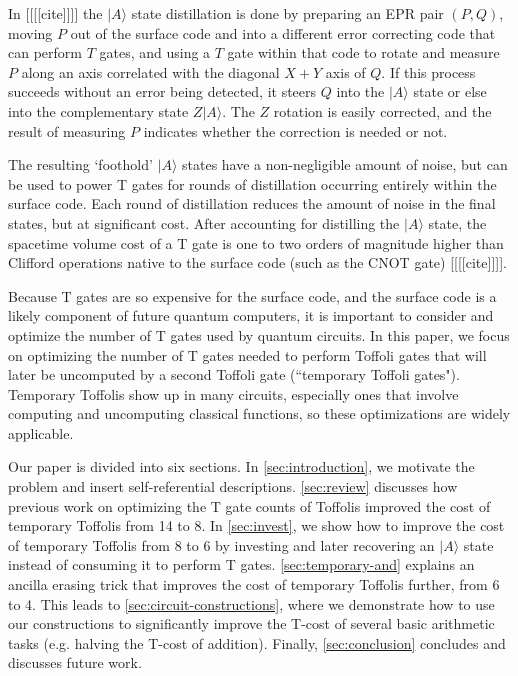 \documentclass[twocolumn,longbibliography]{quantumarticle-customized}
\begin{document}
In [[[[cite]]]] the $|A\rangle$ state distillation is done by preparing an EPR pair $(P, Q)$, moving $P$ out of the surface code and into a different error correcting code that can perform $T$ gates, and using a $T$ gate within that code to rotate and measure $P$ along an axis correlated with the diagonal $X+Y$ axis of $Q$.
If this process succeeds without an error being detected, it steers \cite{Wiseman2007} $Q$ into the $|A\rangle$ state or else into the complementary state $Z|A\rangle$.
The $Z$ rotation is easily corrected, and the result of measuring $P$ indicates whether the correction is needed or not.

The resulting `foothold' $|A\rangle$ states have a non-negligible amount of noise, but can be used to power T gates for rounds of distillation occurring entirely within the surface code.
Each round of distillation reduces the amount of noise in the final states, but at significant cost.
After accounting for distilling the $|A\rangle$ state, the spacetime volume cost of a T gate is one to two orders of magnitude higher than Clifford operations native to the surface code (such as the CNOT gate) [[[[cite]]]].

Because T gates are so expensive for the surface code, and the surface code is a likely component of future quantum computers, it is important to consider and optimize the number of T gates used by quantum circuits.
In this paper, we focus on optimizing the number of T gates needed to perform Toffoli gates that will later be uncomputed by a second Toffoli gate (``temporary Toffoli gates").
Temporary Toffolis show up in many circuits, especially ones that involve computing and uncomputing classical functions, so these optimizations are widely applicable.

Our paper is divided into six sections.
In \autoref{sec:introduction}, we motivate the problem and insert self-referential descriptions.
\autoref{sec:review} discusses how previous work on optimizing the T gate counts of Toffolis improved the cost of temporary Toffolis from 14 to 8.
In \autoref{sec:invest}, we show how to improve the cost of temporary Toffolis from 8 to 6 by investing and later recovering an $|A\rangle$ state instead of consuming it to perform T gates.
\autoref{sec:temporary-and} explains an ancilla erasing trick that improves the cost of temporary Toffolis further, from 6 to 4.
This leads to \autoref{sec:circuit-constructions}, where we demonstrate how to use our constructions to significantly improve the T-cost of several basic arithmetic tasks (e.g. halving the T-cost of addition).
Finally, \autoref{sec:conclusion} concludes and discusses future work.
\end{document}
